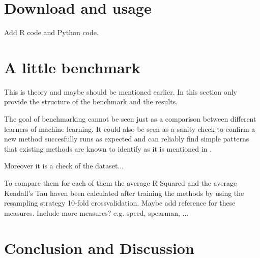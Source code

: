 \documentclass[a4paper]{article}
\begin{document}
\section{Download and usage}

\color{red} Add R code and Python code. \color{black}

\section{A little benchmark}

\color{red} This is theory and maybe should be mentioned earlier. In this section only provide the structure of the benchmark and the results. \color{black}

The goal of benchmarking cannot be seen just as a comparison between different learners of machine learning.
It could also be seen as a sanity check to confirm a new method succesfully runs as expected and can reliably find simple patterns that existing methods are known to identify as it is mentioned in \citet{Hastie2009}. 

\color{red} Moreover it is a check of the dataset... \color{black}

To compare them for each of them the average R-Squared and the average Kendall's Tau haven been calculated after training the methods by using the resampling strategy 10-fold crossvalidation. \color{red} Maybe add reference for these measures. Include more measures? e.g. speed, spearman, ...\color{black}

\section{Conclusion and Discussion}
\label{sec:conclusion}

\FloatBarrier


\end{document}
